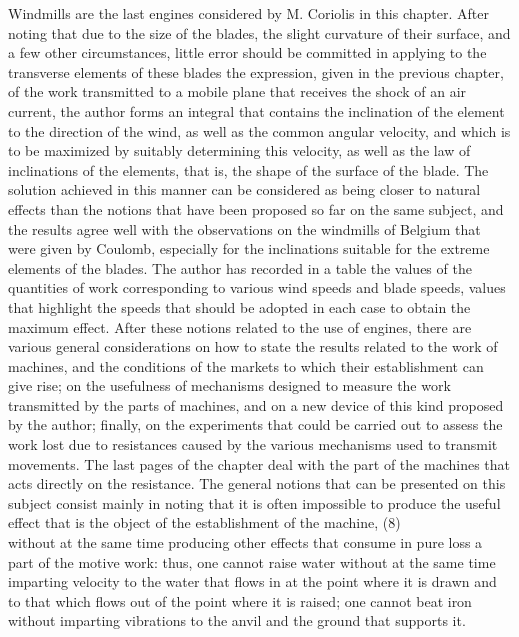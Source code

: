 \documentclass{book}
\begin{document}
Windmills are the last engines considered by M. Coriolis in this chapter. After noting that due to the size of the blades, the slight curvature of their surface, and a few other circumstances, little error should be committed in applying to the transverse elements of these blades the expression, given in the previous chapter, of the work transmitted to a mobile plane that receives the shock of an air current, the author forms an integral that contains the inclination of the element to the direction of the wind, as well as the common angular velocity, and which is to be maximized by suitably determining this velocity, as well as the law of inclinations of the elements, that is, the shape of the surface of the blade. The solution achieved in this manner can be considered as being closer to natural effects than the notions that have been proposed so far on the same subject, and the results agree well with the observations on the windmills of Belgium that were given by Coulomb, especially for the inclinations suitable for the extreme elements of the blades. The author has recorded in a table the values of the quantities of work corresponding to various wind speeds and blade speeds, values that highlight the speeds that should be adopted in each case to obtain the maximum effect. After these notions related to the use of engines, there are various general considerations on how to state the results related to the work of machines, and the conditions of the markets to which their establishment can give rise; on the usefulness of mechanisms designed to measure the work transmitted by the parts of machines, and on a new device of this kind proposed by the author; finally, on the experiments that could be carried out to assess the work lost due to resistances caused by the various mechanisms used to transmit movements. The last pages of the chapter deal with the part of the machines that acts directly on the resistance. The general notions that can be presented on this subject consist mainly in noting that it is often impossible to produce the useful effect that is the object of the establishment of the machine, 
\newpage
(8)\\
without at the same time producing other effects that consume in pure loss a part of the motive work: thus, one cannot raise water without at the same time imparting velocity to the water that flows in at the point where it is drawn and to that which flows out of the point where it is raised; one cannot beat iron without imparting vibrations to the anvil and the ground that supports it.
\end{document}
